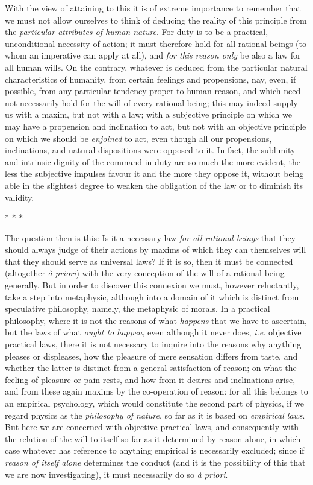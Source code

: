 With the view of attaining to this it is of extreme importance to
remember that we must not allow ourselves to think of deducing the
reality of this principle from the \textit{particular attributes of
human nature}. For duty is to be a practical, unconditional necessity
of action; it must therefore hold for all rational beings (to whom an
imperative can apply at all), and \textit{for this reason only} be
also a law for all human wills. On the contrary, whatever is deduced
from the particular natural characteristics of humanity, from certain
feelings and propensions, nay, even, if possible, from any particular
tendency proper to human reason, and which need not necessarily hold
for the will of every rational being; this may indeed supply us with a
maxim, but not with a law; with a subjective principle on which we may
have a propension and inclination to act, but not with an objective
principle on which we should be \textit{enjoined} to act, even though
all our propensions, inclinations, and natural dispositions were
opposed to it. In fact, the sublimity and intrinsic dignity of the
command in duty are so much the more evident, the less the subjective
impulses favour it and the more they oppose it, without being able in
the slightest degree to weaken the obligation of the law or to
diminish its validity.

\begin{center}* * *\end{center}

The question then is this: Is it a necessary law \textit{for
all rational beings} that they should always judge of their actions by
maxims of which they can themselves will that they should serve as
universal laws? If it is so, then it must be connected (altogether
\textit{\`a priori}) with the very conception of the will of a
rational being generally. But in order to discover this connexion we
must, however reluctantly, take a step into metaphysic, although into
a domain of it which is distinct from speculative philosophy, namely,
the metaphysic of morals. In  a practical philosophy, where
it is not the reasons of what \textit{happens} that we have to
ascertain, but the laws of what \textit{ought to happen}, even
although it never does, \textit{i.e.} objective practical laws, there
it is not necessary to inquire into the reasons why anything pleases
or displeases, how the pleasure of mere sensation differs from taste,
and whether the latter is distinct from a general satisfaction of
reason; on what the feeling of pleasure or pain rests, and how from it
desires and inclinations arise, and from these again maxims by the
co-operation of reason: for all this belongs to an empirical
psychology, which would constitute the second part of physics, if we
regard physics as the \textit{philosophy of nature}, so far as it is
based on \textit{empirical laws}. But here we are concerned with
objective practical laws, and consequently with the relation of the
will to itself so far as it determined by reason alone, in which case
whatever has reference to anything empirical is necessarily excluded;
since if \textit{reason of itself alone} determines the conduct (and
it is the possibility of this that we are now investigating), it must
necessarily do so \textit{\`a priori}.

